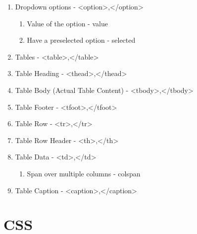 \documentclass[11pt]{article}
\begin{document}
\begin{enumerate}
\begin{enumerate}
\end{enumerate}
\item Dropdown options - <option>,</option>
\begin{enumerate}
\item Value of the option - value
\item Have a preselected option - selected
\end{enumerate}
\item Tables - <table>,</table>
\item Table Heading - <thead>,</thead>
\item Table Body (Actual Table Content) - <tbody>,</tbody>
\item Table Footer - <tfoot>,</tfoot>
\item Table Row - <tr>,</tr>
\item Table Row Header - <th>,</th>
\item Table Data - <td>,</td>
\begin{enumerate}
\item Span over multiple columns - colspan
\end{enumerate}
\item Table Caption - <caption>,</caption>
\end{enumerate}
\section{CSS}
\label{sec:org98792c3}
\end{document}
